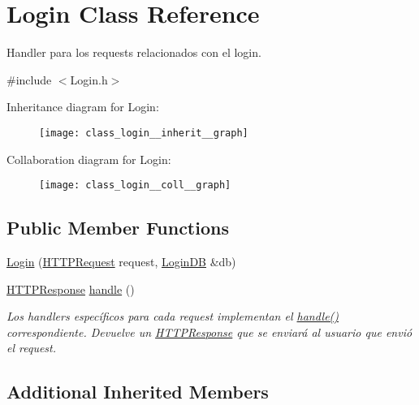 \hypertarget{class_login}{}\section{Login Class Reference}
\label{class_login}


Handler para los requests relacionados con el login.  




{\ttfamily \#include $<$Login.\+h$>$}



Inheritance diagram for Login\+:
\nopagebreak
\begin{figure}[H]
\begin{center}
\leavevmode
\texttt{[image: class\_login\_\_inherit\_\_graph]}
\end{center}
\end{figure}


Collaboration diagram for Login\+:
\nopagebreak
\begin{figure}[H]
\begin{center}
\leavevmode
\texttt{[image: class\_login\_\_coll\_\_graph]}
\end{center}
\end{figure}
\subsection*{Public Member Functions}
\begin{DoxyCompactItemize}
\item 
\hyperlink{class_login_a0cc689ed6645fb6cf8b526e59598fd0d}{Login} (\hyperlink{class_h_t_t_p_request}{H\+T\+T\+P\+Request} request, \hyperlink{class_login_d_b}{Login\+D\+B} \&db)
\item 
\hyperlink{class_h_t_t_p_response}{H\+T\+T\+P\+Response} \hyperlink{class_login_a911fa05b2b1b8f53cad4286012a7810d}{handle} ()
\begin{DoxyCompactList}\small\item\em Los handlers específicos para cada request implementan el \hyperlink{class_login_a911fa05b2b1b8f53cad4286012a7810d}{handle()} correspondiente. Devuelve un \hyperlink{class_h_t_t_p_response}{H\+T\+T\+P\+Response} que se enviará al usuario que envió el request. \end{DoxyCompactList}\end{DoxyCompactItemize}
\subsection*{Additional Inherited Members}


